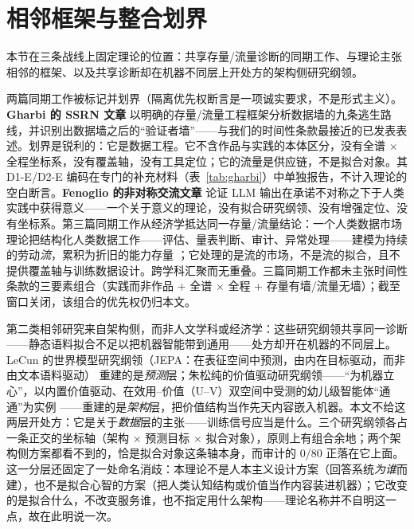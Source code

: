 \documentclass[10pt,fontset=fandol]{ctexart}
\begin{document}
\section{相邻框架与整合划界}\label{sec:concurrent}

本节在三条战线上固定理论的位置：共享存量/流量诊断的同期工作、与理论主张相邻的框架、以及共享诊断却在机器不同层上开处方的架构侧研究纲领。

两篇同期工作被标记并划界（隔离优先权断言是一项诚实要求，不是形式主义）。\textbf{Gharbi 的 SSRN 文章} \cite{gharbi2026model} 以明确的存量/流量工程框架分析数据墙的九条逃生路线，并识别出数据墙之后的“验证者墙”——与我们的时间性条款最接近的已发表表述。划界是锐利的：它是数据工程。它不含作品与实践的本体区分，没有全谱 $\times$ 全程坐标系，没有覆盖轴，没有工具定位；它的流量是供应链，不是拟合对象。其 D1-E/D2-E 编码在专门的补充材料（表~\ref{tab:gharbi}）中单独报告，不计入理论的空白断言。\textbf{Fenoglio 的非对称交流文章} \cite{fenoglio2026asymmetric} 论证 LLM 输出在承诺不对称之下于人类实践中获得意义——一个关于意义的理论，没有拟合研究纲领、没有增强定位、没有坐标系。第三篇同期工作从经济学抵达同一存量/流量结论：一个人类数据市场理论把结构化人类数据工作——评估、量表判断、审计、异常处理——建模为持续的劳动\emph{流}，累积为折旧的能力存量 \cite{ansari2026nolastmile}；它处理的是流的市场，不是流的拟合，且不提供覆盖轴与训练数据设计。跨学科汇聚而无重叠。三篇同期工作都未主张时间性条款的三要素组合（实践而非作品 + 全谱 $\times$ 全程 + 存量有墙/流量无墙）；截至窗口关闭，该组合的优先权仍归本文。

第二类相邻研究来自架构侧，而非人文学科或经济学：这些研究纲领共享同一诊断——静态语料拟合不足以把机器智能带到通用——处方却开在机器的不同层上。LeCun 的世界模型研究纲领（JEPA：在表征空间中预测，由内在目标驱动，而非由文本语料驱动）\cite{lecun2022path} 重建的是\emph{预测}层；朱松纯的价值驱动研究纲领——“为机器立心”，以内置价值驱动、在效用--价值（U--V）双空间中受测的幼儿级智能体“通通”为实例 \cite{zhao2024heart}——重建的是\emph{架构}层，把价值结构当作先天内容嵌入机器。本文不给这两层开处方：它是关于\emph{数据}层的主张——训练信号应当是什么。三个研究纲领各占一条正交的坐标轴（架构 $\times$ 预测目标 $\times$ 拟合对象），原则上有组合余地；两个架构侧方案都看不到的，恰是拟合对象这条轴本身，而审计的 0/80 正落在它上面。这一分层还固定了一处命名消歧：本理论不是人本主义设计方案（回答系统\emph{为谁}而建），也不是拟合心智的方案（把人类认知结构或价值当作内容装进机器）；它改变的是拟合什么，不改变服务谁，也不指定用什么架构——理论名称并不自明这一点，故在此明说一次。
\end{document}
